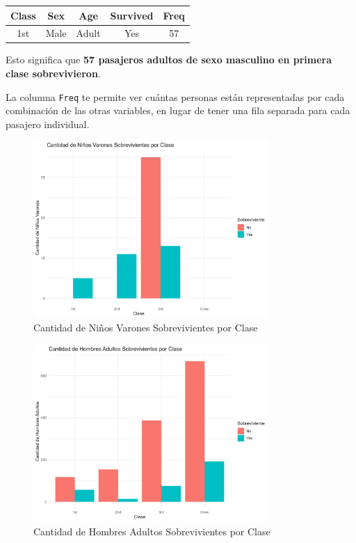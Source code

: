 \documentclass{article}
\begin{document}
    \begin{center}
    \begin{tabular}{|c|c|c|c|c|}
    \hline
    \textbf{Class} & \textbf{Sex} & \textbf{Age} & \textbf{Survived} & \textbf{Freq} \\
    \hline
    1st & Male & Adult & Yes & 57 \\
    \hline
    \end{tabular}
    \end{center}
    
    Esto significa que \textbf{57 pasajeros adultos de sexo masculino en primera clase sobrevivieron}.
    
    La columna \texttt{Freq} te permite ver cuántas personas están representadas por cada combinación de las otras variables, en lugar de tener una fila separada para cada pasajero individual.
    
\begin{figure}[H]
    \centering
    \includegraphics[width=0.8\textwidth]{ninos_varones_sobrevivientes_por_clase.png}
    \caption{Cantidad de Niños Varones Sobrevivientes por Clase}
    \label{fig:ninos_varones_sobrevivientes_por_clase}
\end{figure}


\begin{figure}[H]
    \centering
    \includegraphics[width=0.8\textwidth]{hombres_adultos_sobrevivientes_por_clase.png}
    \caption{Cantidad de Hombres Adultos Sobrevivientes por Clase}
    \label{fig:hombres_adultos_sobrevivientes_por_clase}
\end{figure}
\end{document}
